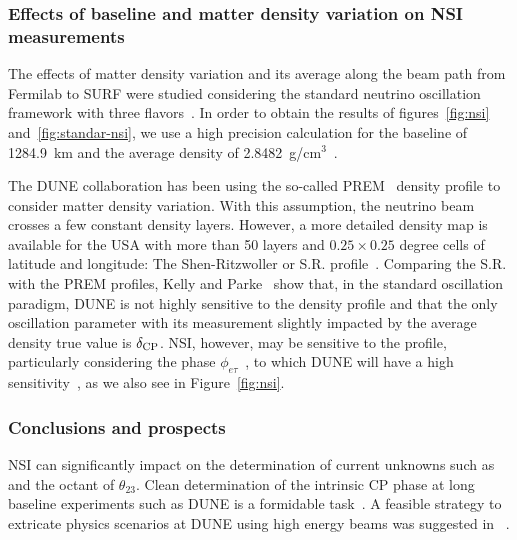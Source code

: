 \subsubsection{Effects of baseline and matter density variation on NSI measurements}\label{ssec:matter}
The effects of matter density variation and its average along the beam path from Fermilab to SURF were studied considering the standard neutrino oscillation framework with three flavors~\cite{Roe:2017zdw,Kelly:2018kmb}. In order to obtain the results of figures~\ref{fig:nsi} and~\ref{fig:standar-nsi}, we use a high precision calculation for the baseline of 1284.9~km and the average density of 2.8482~g/cm$^3$~\cite{Roe:2017zdw}.

The DUNE collaboration has been using the so-called PREM~\cite{Dziewonski:1981xy,PREM2} density profile to consider matter density variation. With this assumption, the neutrino beam crosses a few constant density layers.
However, a more detailed density map is available for the USA with more than 50 layers and $0.25 \times 0.25$ degree cells of latitude and longitude: The Shen-Ritzwoller or S.R. profile~\cite{SR:2016,Roe:2017zdw}. Comparing the S.R. with the PREM profiles, Kelly and Parke~\cite{Kelly:2018kmb} show that, in the standard oscillation paradigm, DUNE is not highly sensitive to the density profile and that the only oscillation parameter with its measurement slightly impacted by the average density true value is $\delta_{\rm CP}$.
NSI, however, may be sensitive to the profile, particularly considering the phase $\phi_{e\tau}$~\cite{Chatterjee:2018dyd}, to which DUNE will have a high sensitivity~\cite{Ohlsson:2012kf,Miranda:2015dra,deGouvea:2015ndi,Coloma:2015kiu,Farzan:2017xzy}, as we also see in Figure~\ref{fig:nsi}.

\subsubsection{Conclusions and prospects}
NSI can significantly impact on the determination of current unknowns such as  and the octant of $\theta_{23}$. Clean determination of the intrinsic CP phase at long baseline experiments such as DUNE is a formidable task~\cite{Rout:2017udo}. A feasible strategy to extricate physics scenarios at DUNE using high energy beams was suggested in ~\cite{Masud:2017bcf}.


